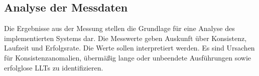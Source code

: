 \subsection{Analyse der Messdaten}
Die Ergebnisse aus der Messung stellen die Grundlage für eine Analyse des implementierten Systems dar. Die Messwerte geben Auskunft über Konsistenz, Laufzeit und Erfolgsrate. Die Werte sollen interpretiert werden. Es sind Ursachen für Konsistenzanomalien, übermäßig lange oder unbeendete Ausführungen sowie erfolglose LLTs zu identifizieren. 

